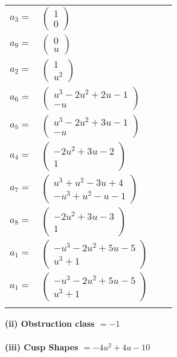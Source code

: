 \documentclass[1p]{elsarticle_modified}
\theoremstyle{definition}
\begin{document}
\begin{tabular}{m{7pt} m{180pt} m{7pt} m{180pt} }
\flushright $a_{3}=$&$\begin{pmatrix}1\\0\end{pmatrix}$ \\
\flushright $a_{9}=$&$\begin{pmatrix}0\\u\end{pmatrix}$ \\
\flushright $a_{2}=$&$\begin{pmatrix}1\\u^2\end{pmatrix}$ \\
\flushright $a_{6}=$&$\begin{pmatrix}u^3-2 u^2+2 u-1\\- u\end{pmatrix}$ \\
\flushright $a_{5}=$&$\begin{pmatrix}u^3-2 u^2+3 u-1\\- u\end{pmatrix}$ \\
\flushright $a_{4}=$&$\begin{pmatrix}-2 u^2+3 u-2\\1\end{pmatrix}$ \\
\flushright $a_{7}=$&$\begin{pmatrix}u^3+u^2-3 u+4\\- u^3+u^2- u-1\end{pmatrix}$ \\
\flushright $a_{8}=$&$\begin{pmatrix}-2 u^2+3 u-3\\1\end{pmatrix}$ \\
\flushright $a_{1}=$&$\begin{pmatrix}- u^3-2 u^2+5 u-5\\u^3+1\end{pmatrix}$\\ \flushright $a_{1}=$&$\begin{pmatrix}- u^3-2 u^2+5 u-5\\u^3+1\end{pmatrix}$\\&\end{tabular}
\flushleft \textbf{(ii) Obstruction class $= -1$}\\~\\
\flushleft \textbf{(iii) Cusp Shapes $= -4 u^2+4 u-10$}\\~\\
\end{document}
